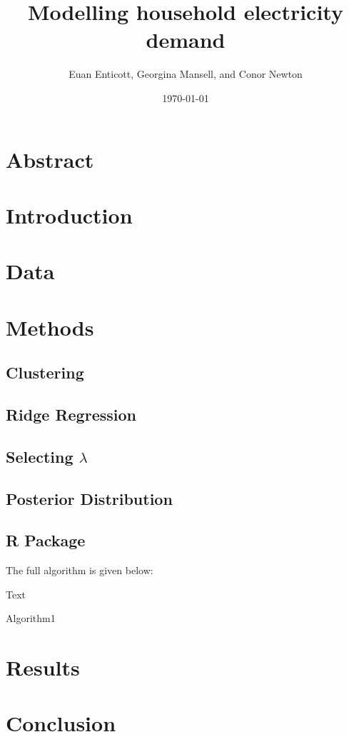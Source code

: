 \documentclass[11pt,a4paper]{article}
\begin{document}
\title{Modelling household electricity demand}
\author{Euan Enticott, Georgina Mansell, and Conor Newton}
\date{\today}

\maketitle
 
\section*{Abstract}


\section{Introduction}

\section{Data} \label{data}

\section{Methods} \label{methods}

\subsection{Clustering}

\subsection{Ridge Regression} 

\subsection{Selecting $\lambda$}
 
\subsection{Posterior Distribution} 

\subsection{R Package} 

The full algorithm is given below:

\begin{algorithm}[H] \label{alg1}
\DontPrintSemicolon
\SetAlgoLined
{}
Text\;
\caption{Algorithm1}
\end{algorithm}


\section{Results}

\section{Conclusion}

\pagebreak



\end{document}
